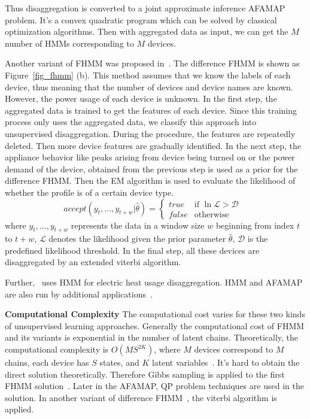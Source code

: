 Thus disaggregation is converted to a joint approximate inference AFAMAP problem.  
It's a convex quadratic program which can be solved by classical optimization algorithms.
Then with aggregated data as input, we can get the $M$ number of HMMs corresponding to $M$ devices. 

Another variant of FHMM was proposed in~\cite{parson2012nonintrusive}. 
The difference FHMM is shown as Figure~\ref{fig_fhmm} (b). 
This method assumes that we know the labels of each device, thus meaning that the number of devices and device names are known. 
However, the power usage of each device is unknown. 
In the first step, the aggregated data is 
trained to get the features of each device. 
Since this training process only uses the aggregated data, we classify this approach into unsupervised disaggregation. 
During the procedure, 
the features are repeatedly deleted. 
Then more device features are gradually identified. 
In the next step, the appliance behavior like peaks arising from device being turned on or the power demand of the device, 
obtained from the previous step is used as a prior for the difference FHMM. Then the EM algorithm is used to evaluate the likelihood of whether the profile is of a certain device type.
\begin{displaymath}
accept(y_{t},...,y_{t+w}|\hat{\theta})= \left \{ \begin{array} {ll}
true & \textrm{if $\ln\mathcal{L} > \mathcal{D}$ } \\
false & \textrm{otherwise} \end{array} \right.
\end{displaymath}
where $y_t,...,y_{t+w}$ represents the data in a window size $w$
beginning from index $t$ to $t+w$, $\mathcal{L}$ denotes the
likelihood given the prior parameter $\hat{\theta}$,
$\mathcal{D}$ is the predefined likelihood threshold.
In the final step, all these devices are disaggregated by an extended viterbi algorithm. 

Further,~\cite{huang2013designing} uses HMM for electric heat usage disaggregation. %
HMM and AFAMAP are also run by additional applications~\cite{lukaszewski2013methods}. 

\textbf{Computational Complexity}
The computational cost varies for these two kinds of unsupervised learning 
approaches.
Generally the computational cost of FHMM and its variants is exponential in 
the number of latent chains.  
Theoretically, the computational complexity is 
$O(MS^{2K})$, where $M$ devices correspond to $M$ chains, 
each device has $S$ states, and $K$ latent variables~\cite{bishop2006pattern}. 
It's hard to obtain the direct solution theoretically. 
Therefore Gibbs sampling is applied to the first 
FHMM solution~\cite{kim2011unsupervised}. 
Later in the AFAMAP, QP problem techniques are used in the solution.
In another variant of difference FHMM~\cite{parson2012nonintrusive}, 
the viterbi algorithm is applied. 

